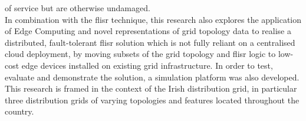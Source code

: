 of service but are otherwise undamaged.
\\
In combination with the \acs{flisr} technique, this research also explores the application of Edge Computing and novel representations of grid topology data to realise a distributed, fault-tolerant \acs{flisr} solution which
is not fully reliant on a centralised cloud deployment, by moving subsets of the grid topology and \acs{flisr} logic to low-cost edge devices installed on existing grid infrastructure. In order to test, evaluate and demonstrate the solution,
a simulation platform was also developed. This research is framed in the context of the Irish distribution grid, in particular three distribution grids of varying topologies and features located throughout the country.

